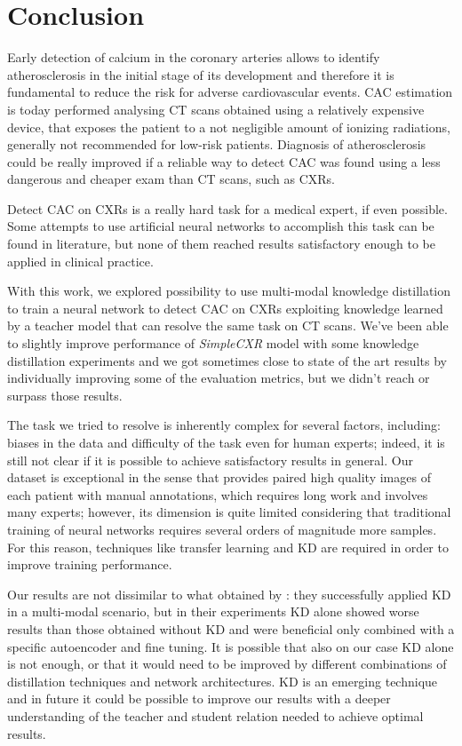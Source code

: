 \chapter{Conclusion}\label{sec:conclusion}
Early detection of calcium in the coronary arteries allows to identify atherosclerosis in the initial stage of its development and therefore it is fundamental to reduce the risk for adverse cardiovascular events.
CAC estimation is today performed analysing CT scans obtained using a relatively expensive device, that exposes the patient to a not negligible amount of ionizing radiations, generally not recommended for low-risk patients.
Diagnosis of atherosclerosis could be really improved if a reliable way to detect CAC was found using a less dangerous and cheaper exam than CT scans, such as CXRs.

Detect CAC on CXRs is a really hard task for a medical expert, if even possible.
Some attempts to use artificial neural networks to accomplish this task can be found in literature, but none of them reached results satisfactory enough to be applied in clinical practice.

With this work, we explored possibility to use multi-modal knowledge distillation to train a neural network to detect CAC on CXRs exploiting knowledge learned by a teacher model that can resolve the same task on CT scans.
We've been able to slightly improve performance of \emph{SimpleCXR} model with some knowledge distillation experiments and we got sometimes close to state of the art results by individually improving some of the evaluation metrics, but we didn't reach or surpass those results.

The task we tried to resolve is inherently complex for several factors, including: biases in the data and difficulty of the task even for human experts; indeed, it is still not clear if it is possible to achieve satisfactory results in general.
Our dataset is exceptional in the sense that provides paired high quality images of each patient with manual annotations, which requires long work and involves many experts; however, its dimension is quite limited considering that traditional training of neural networks requires several orders of magnitude more samples.
For this reason, techniques like transfer learning and KD are required in order to improve training performance.

Our results are not dissimilar to what obtained by \citeauthor{zhang2023distilling} \cite{zhang2023distilling}: they successfully applied KD in a multi-modal scenario, but in their experiments KD alone showed worse results than those obtained without KD and were beneficial only combined with a specific autoencoder and fine tuning.
It is possible that also on our case KD alone is not enough, or that it would need to be improved by different combinations of distillation techniques and network architectures.
KD is an emerging technique and in future it could be possible to improve our results with a deeper understanding of the teacher and student relation needed to achieve optimal results.


